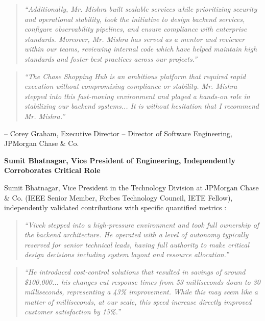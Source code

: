 \begin{quote}
\textit{``Additionally, Mr. Mishra built scalable services while prioritizing security and operational stability, took the initiative to design backend services, configure observability pipelines, and ensure compliance with enterprise standards. Moreover, Mr. Mishra has served as a mentor and reviewer within our teams, reviewing internal code which have helped maintain high standards and foster best practices across our projects.''}
\end{quote}

\begin{quote}
\textit{``The Chase Shopping Hub is an ambitious platform that required rapid execution without compromising compliance or stability. Mr. Mishra stepped into this fast-moving environment and played a hands-on role in stabilizing our backend systems... It is without hesitation that I recommend Mr. Mishra.''}
\end{quote}

\hfill -- Corey Graham, Executive Director -- Director of Software Engineering, JPMorgan Chase \& Co.

\vspace{1em}

\textbf{Sumit Bhatnagar, Vice President of Engineering, Independently Corroborates \drs Critical Role}

Sumit Bhatnagar, Vice President in the Technology Division at JPMorgan Chase \& Co. (IEEE Senior Member, Forbes Technology Council, IETE Fellow), independently validated \drs contributions with specific quantified metrics \cite{CR9}:

\begin{quote}
\textit{``Vivek stepped into a high-pressure environment and took full ownership of the backend architecture. He operated with a level of autonomy typically reserved for senior technical leads, having full authority to make critical design decisions including system layout and resource allocation.''}
\end{quote}

\begin{quote}
\textit{``He introduced cost-control solutions that resulted in savings of around \$100,000... his changes cut response times from 53 milliseconds down to 30 milliseconds, representing a 43\% improvement. While this may seem like a matter of milliseconds, at our scale, this speed increase directly improved customer satisfaction by 15\%.''}
\end{quote}

